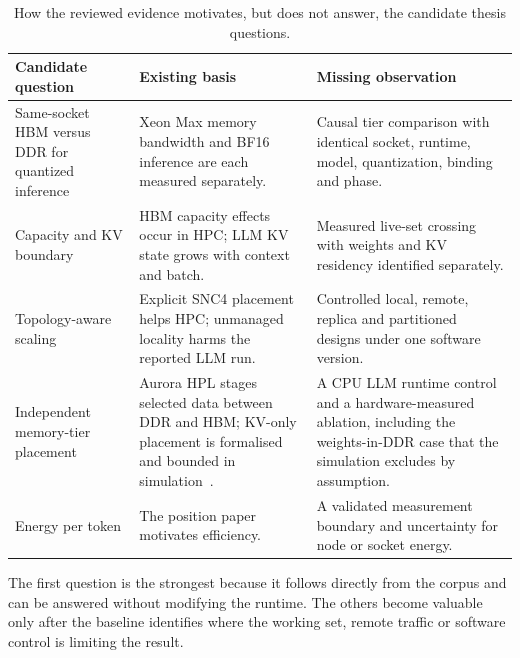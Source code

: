 \begin{table}[htbp]
\centering
\small
\tabsetup
\caption{How the reviewed evidence motivates, but does not answer, the
candidate thesis questions.}
\label{tab:evidence-questions}
\begin{tabularx}{\textwidth}{@{}P{3.1cm}YY@{}}
\toprule
\headrow
\textbf{Candidate question} & \textbf{Existing basis} &
\textbf{Missing observation} \\
\midrule
Same-socket HBM versus DDR for quantized inference
& Xeon Max memory bandwidth and BF16 inference are each measured
  separately.
& Causal tier comparison with identical socket, runtime, model,
  quantization, binding and phase. \\
\addlinespace
Capacity and KV boundary
& HBM capacity effects occur in HPC; LLM KV state grows with context
  and batch.
& Measured live-set crossing with weights and KV residency identified
  separately. \\
\addlinespace
Topology-aware scaling
& Explicit SNC4 placement helps HPC; unmanaged locality harms the
  reported LLM run.
& Controlled local, remote, replica and partitioned designs under one
  software version. \\
\addlinespace
Independent memory-tier placement
& Aurora HPL stages selected data between DDR and HBM; KV-only
  placement is formalised and bounded in
  simulation~\cite{fang2025kvplacement}.
& A CPU LLM runtime control and a hardware-measured ablation, including
  the weights-in-DDR case that the simulation excludes by
  assumption. \\
\addlinespace
Energy per token
& The position paper motivates efficiency.
& A validated measurement boundary and uncertainty for node or socket
  energy. \\
\bottomrule
\end{tabularx}
\end{table}

The first question is the strongest because it follows directly from
the corpus and can be answered without modifying the runtime.  The
others become valuable only after the baseline identifies where the
working set, remote traffic or software control is limiting the result.
